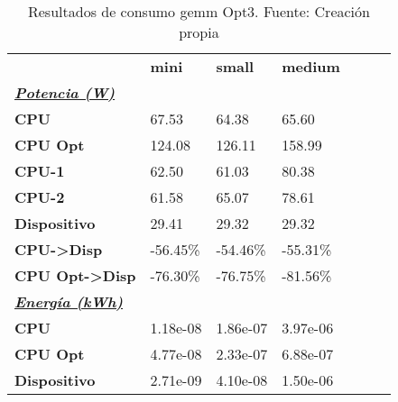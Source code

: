 \begin{table}[H]
    \centering
    \begin{tabular}{lllllll}
    \rowcolor[HTML]{DAE8FC} \ & \textbf{mini} & \textbf{	small} & \textbf{	medium} \\
    \cellcolor[HTML]{DAE8FC} \textbf{\textbf{{\emph{{\underline{{Potencia (W)}}}}}}} &  & 	 & 	 \\
    \rowcolor[HTML]{EFEFEF} \cellcolor[HTML]{DAE8FC} \textbf{CPU} & 67.53 & 	64.38 & 	65.60 \\
    \cellcolor[HTML]{DAE8FC} \textbf{CPU Opt} & 124.08 & 	126.11 & 	158.99 \\
    \rowcolor[HTML]{EFEFEF} \cellcolor[HTML]{DAE8FC} \textbf{\quad CPU-1} & 62.50 & 	61.03 & 	80.38 \\
    \cellcolor[HTML]{DAE8FC} \textbf{\quad CPU-2} & 61.58 & 	65.07 & 	78.61 \\
    \rowcolor[HTML]{EFEFEF} \cellcolor[HTML]{DAE8FC} \textbf{Dispositivo} & 29.41 & 	29.32 & 	29.32 \\
    \cellcolor[HTML]{DAE8FC} \textbf{CPU->Disp} & -56.45\% & 	-54.46\% & 	-55.31\% \\
    \rowcolor[HTML]{EFEFEF} \cellcolor[HTML]{DAE8FC} \textbf{CPU Opt->Disp} & -76.30\% & 	-76.75\% & 	-81.56\% \\
    \cellcolor[HTML]{DAE8FC} \textbf{\textbf{{\emph{{\underline{{Energía (kWh)}}}}}}} &  & 	 & 	 \\
    \rowcolor[HTML]{EFEFEF} \cellcolor[HTML]{DAE8FC} \textbf{CPU} & 1.18e-08 & 	1.86e-07 & 	3.97e-06 \\
    \cellcolor[HTML]{DAE8FC} \textbf{CPU Opt} & 4.77e-08 & 	2.33e-07 & 	6.88e-07 \\
    \rowcolor[HTML]{EFEFEF} \cellcolor[HTML]{DAE8FC} \textbf{Dispositivo} & 2.71e-09 & 	4.10e-08 & 	1.50e-06 \\
    \end{tabular}
    \caption[Resultados de consumo gemm Opt3]{{Resultados de consumo gemm Opt3. Fuente: Creación propia}}
    \label{table_test_gemm_Opt3_hw_powerResults}
\end{table}